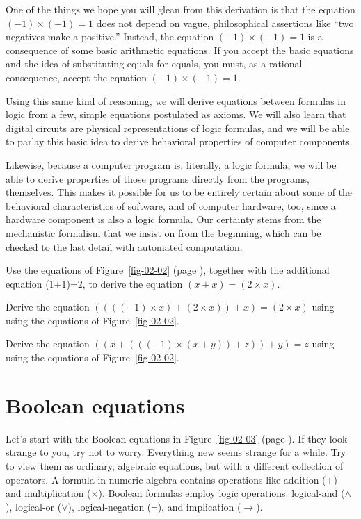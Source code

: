 One of the things we hope you will glean from this derivation is that
the equation $(-1)\times(-1) = 1$ does not depend on vague,
philosophical assertions like ``two negatives make a positive.''
Instead, the equation $(-1)\times(-1) = 1$ is a consequence of some
basic arithmetic equations. If you accept the basic equations
and the idea of substituting equals for equals, you must, as a
rational consequence, accept the equation $(-1)\times(-1) = 1$.

Using this same kind of reasoning, we will derive equations between
formulas in logic from a few, simple equations postulated as
axioms. We will also learn that digital circuits are physical
representations of logic formulas, and we will be able to
parlay this basic idea to derive behavioral properties of
computer components.

Likewise, because a computer program is,
literally, a logic formula, we will be able to derive
properties of those programs directly from the programs,
themselves. This makes it possible for us to be entirely
certain about some of the behavioral characteristics of
software, and of computer hardware, too, since a hardware component is also a logic formula. Our certainty stems from the mechanistic
formalism that we insist on from the beginning,
which can be checked to the last detail with automated computation.

\begin{ExerciseList}
\label{ex:ch02-intro}
\Exercise
Use the equations of Figure~\ref{fig-02-02} (page \pageref{fig-02-02}),
together with the additional equation (1+1)=2, to derive the equation $(x + x) = (2 \times x)$.

\Exercise
Derive the equation $((((-1) \times x) + (2 \times x)) + x) = (2 \times x)$
using using the equations of Figure~\ref{fig-02-02}.

\Exercise
Derive the equation $((x + (((-1) \times (x + y)) + z)) + y) = z$
using using the equations of Figure~\ref{fig-02-02}.
\end{ExerciseList}

\section{Boolean equations}
\label{sec:boolean-equations}
Let's start with the Boolean equations in Figure~\ref{fig-02-03} (page \pageref{fig-02-03}).
If they look strange to you, try not to worry. Everything new seems
strange for a while. Try to view them as ordinary, algebraic
equations, but with a different collection of operators. A
formula in numeric algebra contains operations like addition
($+$) and multiplication ($\times$). Boolean formulas employ logic
operations: logical-and ($\wedge$), logical-or ($\vee$),
logical-negation ($\neg$), and implication ($\rightarrow$).

